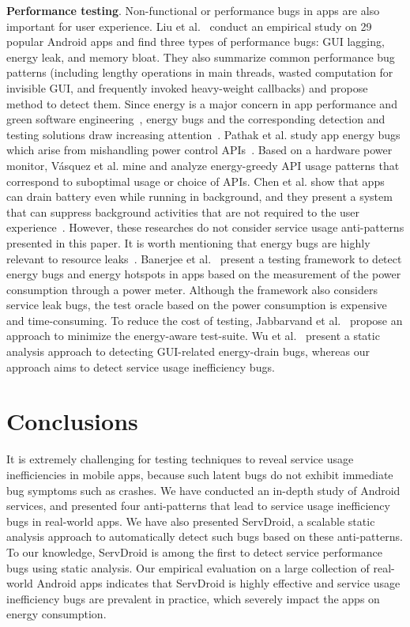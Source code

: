 \documentclass[sigconf,review, anonymous]{acmart}
\begin{document}
\textbf{Performance testing}. Non-functional or performance bugs in apps are
also important for user experience. Liu et al.~\cite{LiuXC14} conduct an
empirical study on 29 popular Android apps and find three types of performance
bugs: GUI lagging, energy leak, and memory bloat. They also summarize common
performance bug patterns (including lengthy operations in main threads, wasted
computation for invisible GUI, and frequently invoked heavy-weight callbacks)
and propose method to detect them. Since energy is a major concern in app
performance and green software
engineering~\cite{PangHAH16,HoqueSKXT16,MBZSJSPC16,0036990}, energy bugs and the
corresponding detection and testing solutions draw increasing attention~\cite{QianWGMSS11,PathakJHM12,VasquezBBOPP14,GuoZYZZ13,BanerjeeC0R14,LiuXCL14,BehrouzSBM16,WuYR16,JabbarvandM17}.
Pathak et al. study app energy bugs which arise from mishandling power control APIs~\cite{PathakJHM12}.  Based on a hardware power monitor, V{\'{a}}squez et al. mine and
analyze energy-greedy API usage patterns that correspond to suboptimal usage or choice of APIs. Chen et al. show that apps can drain battery even while running in background, and they present a system that can suppress background activities that are not required to the user experience~\cite{ChenJDHGV15}. However, these researches do not consider service usage anti-patterns presented in this paper. It is worth mentioning that energy bugs are highly relevant to resource
leaks~\cite{GuoZYZZ13,BanerjeeC0R14,LiuXCL14,WuYR16}. Banerjee et
al.~\cite{BanerjeeC0R14,BanerjeeCBR18} present a testing framework to detect energy bugs and
energy hotspots in apps based on the measurement of the power consumption through a power meter.
Although the framework also considers service leak bugs, the test oracle based
on the power consumption is expensive and time-consuming.
To reduce the cost of testing, Jabbarvand et al.~\cite{BehrouzSBM16} propose an
approach to minimize the energy-aware test-suite. Wu et
al.~\cite{WuYR16} present a static analysis approach to detecting GUI-related energy-drain
bugs, whereas our approach aims to detect service usage inefficiency bugs.

\section{Conclusions}\label{conclusion}
It is extremely challenging for testing techniques to reveal service usage
inefficiencies in mobile apps, because such latent bugs do not exhibit
immediate bug symptoms such as crashes.
We have conducted an in-depth study of Android services, and presented four
anti-patterns that lead to service usage inefficiency bugs in real-world apps.
We have also presented {\sf ServDroid}, a scalable static
analysis approach to automatically detect such bugs based on
these anti-patterns.
To our knowledge, {\sf ServDroid} is among the first to
detect service performance bugs using static analysis.
Our empirical evaluation on a large collection of real-world Android
apps indicates that {\sf ServDroid} is highly effective and service usage
inefficiency bugs are prevalent in practice, which severely impact the apps
on energy consumption.
\end{document}
